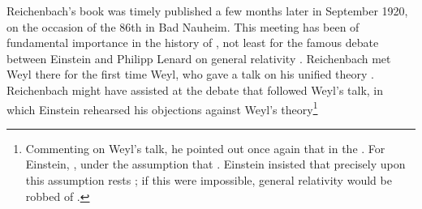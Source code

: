\documentclass[draft]{article}
\newcommand{\WT}{Weyl's theory\xspace}
\begin{document}
Reichenbach's book was timely published a few months later in September 1920, on the occasion of the 86th  in Bad Nauheim. This meeting has been of fundamental importance in the history of \rt, not least for the famous debate between Einstein and Philipp Lenard on general relativity \citep{Dongen2007}. Reichenbach met Weyl there for the first time Weyl, who gave a talk on his unified theory \citep{Weyl1920}. Reichenbach might have assisted at the debate that followed Weyl's talk, in which Einstein rehearsed his objections against \WT\footnote{Commenting on Weyl's talk, he pointed out once again that in the   \citep[650]{Einstein1920c}. For Einstein, , under the assumption that  \citep[650]{Einstein1920c}. Einstein insisted that precisely upon this assumption rests ; if this were impossible, general relativity would be robbed of  \citep[650]{Einstein1920c}.
}
\end{document}
